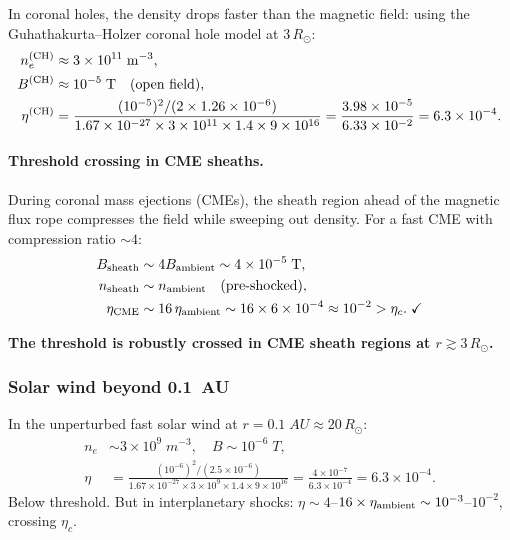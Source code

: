 \documentclass[aps,prd,twocolumn,superscriptaddress,floatfix,nofootinbib]{revtex4-2}
\newcommand{\Rsun}{R_\odot}
\begin{document}
In coronal holes, the density drops faster than the magnetic field:
using the Guhathakurta--Holzer coronal hole model at $3\,\Rsun$:
\begin{align}
n_e^{(\rm CH)} &\approx 3\times10^{11}\;\si{m^{-3}}, \\
B^{(\rm CH)} &\approx 10^{-5}\;\si{T}\quad\text{(open field)}, \\
\eta^{(\rm CH)} &= \frac{(10^{-5})^2/(2\times1.26\times10^{-6})}
{1.67\times10^{-27}\times3\times10^{11}\times1.4\times9\times10^{16}}
= \frac{3.98\times10^{-5}}{6.33\times10^{-2}}
= 6.3\times10^{-4}.
\end{align}

\paragraph{Threshold crossing in CME sheaths.}
During coronal mass ejections (CMEs), the sheath region ahead of the
magnetic flux rope compresses the field while sweeping out density.
For a fast CME with compression ratio $\sim 4$:
\begin{align}
B_{\rm sheath} &\sim 4B_{\rm ambient} \sim 4\times10^{-5}\;\si{T}, \\
n_{\rm sheath} &\sim n_{\rm ambient}\quad\text{(pre-shocked)}, \\
\eta_{\rm CME} &\sim 16\,\eta_{\rm ambient} \sim 16\times6\times10^{-4}
\approx 10^{-2} > \eta_c.\;\checkmark
\end{align}

\textbf{The threshold is robustly crossed in CME sheath regions at
$r \gtrsim 3\,\Rsun$.}

\subsubsection{Solar wind beyond 0.1~AU}

In the unperturbed fast solar wind at $r = 0.1\;\si{AU} \approx 20\,\Rsun$:
\begin{align}
n_e &\sim 3\times10^9\;\si{m^{-3}}, \quad
B \sim 10^{-6}\;\si{T}, \\
\eta &= \frac{(10^{-6})^2/(2.5\times10^{-6})}
{1.67\times10^{-27}\times3\times10^9\times1.4\times9\times10^{16}}
= \frac{4\times10^{-7}}{6.3\times10^{-4}} = 6.3\times10^{-4}.
\end{align}
Below threshold. But in interplanetary shocks:
$\eta \sim 4$--$16\times\eta_{\rm ambient} \sim 10^{-3}$--$10^{-2}$,
crossing $\eta_c$.

\end{document}
